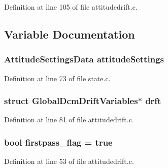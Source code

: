 \-Definition at line 105 of file attitudedrift.\-c.



\subsection{\-Variable \-Documentation}
\hypertarget{group___c_c_state_ga8f6543ab52bafea6c0858baeeae8db59}{
\subsubsection[{attitude\-Settings}]{\setlength{\rightskip}{0pt plus 5cm}\-Attitude\-Settings\-Data {\bf attitude\-Settings}}}\label{group___c_c_state_ga8f6543ab52bafea6c0858baeeae8db59}


\-Definition at line 73 of file state.\-c.

\hypertarget{group___c_c_state_ga89657be5e41cdb8b74d42e587333115a}{
\subsubsection[{drft}]{\setlength{\rightskip}{0pt plus 5cm}struct {\bf \-Global\-Dcm\-Drift\-Variables}$\ast$ {\bf drft}}}\label{group___c_c_state_ga89657be5e41cdb8b74d42e587333115a}


\-Definition at line 81 of file attitudedrift.\-c.

\hypertarget{group___c_c_state_ga82c3e02e8def62d93a337dc338c4d6cd}{
\subsubsection[{firstpass\-\_\-flag}]{\setlength{\rightskip}{0pt plus 5cm}bool {\bf firstpass\-\_\-flag} = true}}\label{group___c_c_state_ga82c3e02e8def62d93a337dc338c4d6cd}


\-Definition at line 53 of file attitudedrift.\-c.

